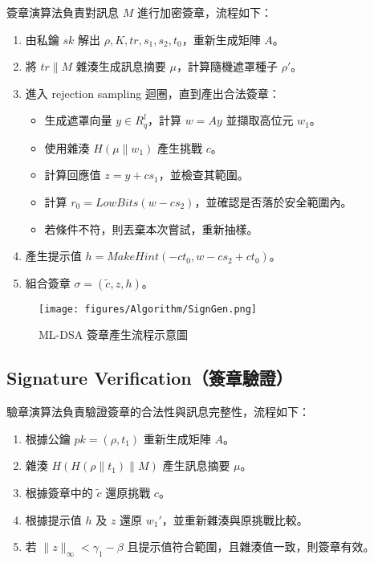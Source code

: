 \documentclass[12pt, a4paper, fleqn]{./styles/ntust_report}
\begin{document}
簽章演算法負責對訊息 $M$ 進行加密簽章，流程如下：

\begin{enumerate}
  \item 由私鑰 $sk$ 解出 $\rho, K, tr, s_1, s_2, t_0$，重新生成矩陣 $A$。
  \item 將 $tr \| M$ 雜湊生成訊息摘要 $\mu$，計算隨機遮罩種子 $\rho'$。
  \item 進入 rejection sampling 迴圈，直到產出合法簽章：
  \begin{itemize}
    \item 生成遮罩向量 $y \in R_q^l$，計算 $w = Ay$ 並擷取高位元 $w_1$。
    \item 使用雜湊 $H(\mu \| w_1)$ 產生挑戰 $c$。
    \item 計算回應值 $z = y + cs_1$，並檢查其範圍。
    \item 計算 $r_0 = LowBits(w - cs_2)$，並確認是否落於安全範圍內。
    \item 若條件不符，則丟棄本次嘗試，重新抽樣。
  \end{itemize}
  \item 產生提示值 $h = MakeHint(-ct_0, w - cs_2 + ct_0)$。
  \item 組合簽章 $\sigma = (\tilde{c}, z, h)$。
\end{enumerate}

\begin{figure}[H]
    \centering
    \texttt{[image: figures/Algorithm/SignGen.png]}
    \caption{ML-DSA 簽章產生流程示意圖}
\end{figure}

\subsection{Signature Verification（簽章驗證）}

驗章演算法負責驗證簽章的合法性與訊息完整性，流程如下：

\begin{enumerate}
  \item 根據公鑰 $pk = (\rho, t_1)$ 重新生成矩陣 $A$。
  \item 雜湊 $H(H(\rho \| t_1) \| M)$ 產生訊息摘要 $\mu$。
  \item 根據簽章中的 $\tilde{c}$ 還原挑戰 $c$。
  \item 根據提示值 $h$ 及 $z$ 還原 $w_1'$，並重新雜湊與原挑戰比較。
  \item 若 $\|z\|_\infty < \gamma_1 - \beta$ 且提示值符合範圍，且雜湊值一致，則簽章有效。
\end{enumerate}
\end{document}
